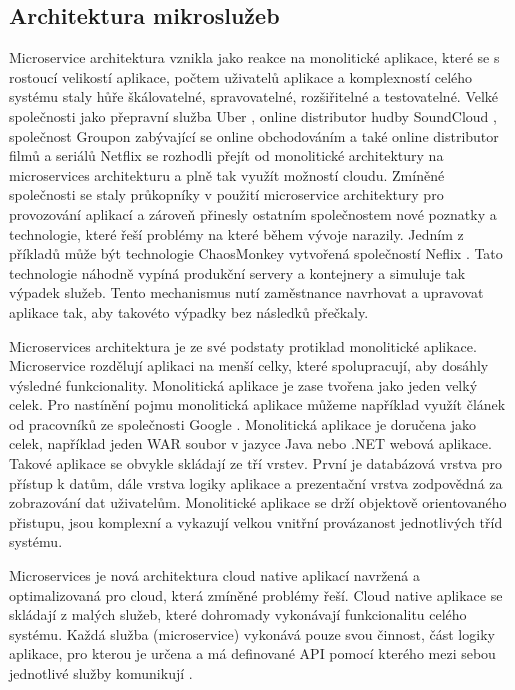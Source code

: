 \subsection{Architektura mikroslužeb}
Microservice architektura vznikla jako reakce na monolitické aplikace, které se s rostoucí velikostí aplikace, počtem uživatelů aplikace a komplexností celého systému staly hůře škálovatelné, spravovatelné, rozšiřitelné a testovatelné. Velké společnosti jako přepravní služba Uber \cite{uber}, online distributor hudby SoundCloud \cite{soundcloud}, společnost \linebreak Groupon zabývající se online obchodováním \cite{groupon} a také online distributor filmů a seriálů Netflix se rozhodli přejít od monolitické architektury na microservices architekturu a plně tak využít možností cloudu. Zmíněné společnosti se staly průkopníky v použití microservice architektury pro provozování aplikací a zároveň přinesly ostatním společnostem nové poznatky a technologie, které řeší problémy na které během vývoje narazily. Jedním z příkladů může být technologie ChaosMonkey vytvořená společností Neflix \cite{chaosmonkey}. Tato technologie náhodně vypíná produkční servery a kontejnery a simuluje tak výpadek služeb. Tento mechanismus nutí zaměstnance navrhovat a upravovat aplikace tak, aby takovéto výpadky bez následků přečkaly.\par
Microservices architektura je ze své podstaty protiklad monolitické aplikace. Microservice rozdělují aplikaci na menší celky, které spolupracují, aby dosáhly výsledné funkcionality. Monolitická aplikace je zase tvořena jako jeden velký celek. Pro nastínění pojmu monolitická aplikace můžeme například využít článek od pracovníků ze \linebreak společnosti Google \cite{googleMonolith}. Monolitická aplikace je doručena jako celek, například jeden WAR soubor v jazyce Java nebo .NET webová aplikace. Takové aplikace se obvykle skládají ze tří vrstev. První je databázová vrstva pro přístup k datům, dále vrstva logiky aplikace a prezentační vrstva zodpovědná za zobrazování dat uživatelům. Monolitické aplikace se drží objektově orientovaného přistupu, jsou komplexní a vykazují velkou vnitřní provázanost jednotlivých tříd systému. \par
Microservices je nová architektura cloud native aplikací navržená a optimalizovaná pro cloud, která zmíněné problémy řeší. Cloud native aplikace se skládají z malých služeb, které dohromady vykonávají funkcionalitu celého systému. Každá služba (microservice) vykonává pouze svou činnost, část logiky aplikace, pro kterou je určena a má definované API pomocí kterého mezi sebou jednotlivé služby komunikují \cite{balalaieMicroservies}. \par
